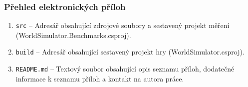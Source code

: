 
\subsubsection{Přehled elektronických příloh}

\begin{enumerate}
    \item \texttt{src} -- Adresář obsahující zdrojové soubory a sestavený projekt měření (WorldSimulator.Benchmarks.csproj).

    \item \texttt{build} -- Adresář obsahující sestavený projekt hry (WorldSimulator.csproj).

    \item \texttt{README.md} -- Textový soubor obsahující opis seznamu příloh, dodatečné informace k seznamu příloh a kontakt na autora práce.
\end{enumerate}
